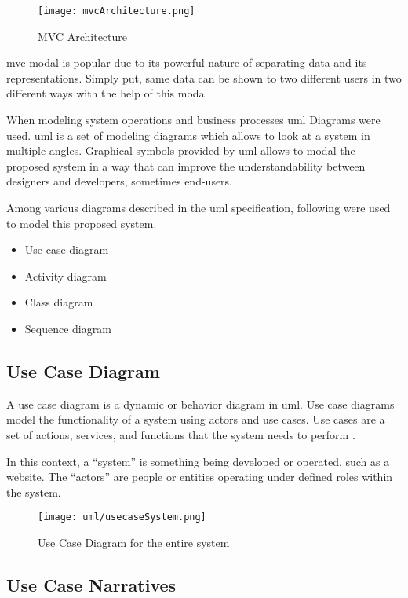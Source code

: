 \documentclass[12pt]{report}
\begin{document}
\begin{figure}[H]
	\centering
	\texttt{[image: mvcArchitecture.png]}
	\caption{MVC Architecture}
\end{figure}

\acrshort{mvc} modal is popular due to its powerful nature of separating data and its representations. Simply put, same data can be shown to two different users in two different ways with the help of this modal.

When modeling system operations and business processes \acrshort{uml} Diagrams were used. \acrshort{uml} is a set of modeling diagrams which allows to look at a system in multiple angles. Graphical symbols provided by \acrshort{uml} allows to modal the proposed system in a way that can improve the understandability between designers and developers, sometimes end-users.

Among various diagrams described in the \acrshort{uml} specification, following were used to model this proposed system.

\begin{itemize}
	\item Use case diagram
	\item Activity diagram
	\item Class diagram
	\item Sequence diagram
\end{itemize}

\newpage
\subsection{Use Case Diagram}
A use case diagram is a dynamic or behavior diagram in \acrshort{uml}. Use case diagrams model the functionality of a system using actors and use cases. Use cases are a set of actions, services, and functions that the system needs to perform \cite{vparadigm_2018_uml}.

In this context, a ``system'' is something being developed or operated, such as a website. The ``actors'' are people or entities operating under defined roles within the system.

\begin{figure}[H]
	\centering
	\texttt{[image: uml/usecaseSystem.png]}
	\caption{Use Case Diagram for the entire system}
\end{figure}

\newpage
\subsection{Use Case Narratives}
\end{document}
